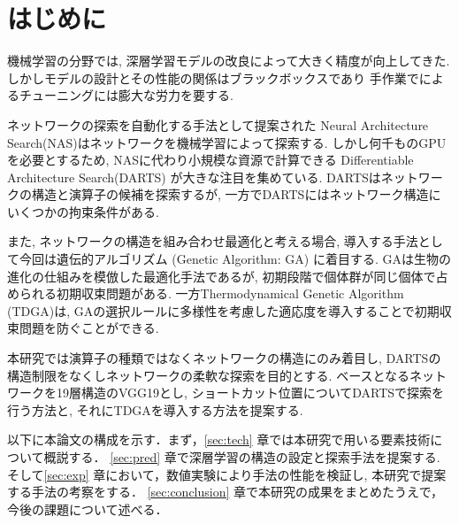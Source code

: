 \newpage
\changeindent{0cm}
\section{はじめに}
\label{sec:intro}
\changeindent{2cm}

機械学習の分野では, 深層学習モデルの改良によって大きく精度が向上してきた.
しかしモデルの設計とその性能の関係はブラックボックスであり
手作業でによるチューニングには膨大な労力を要する.

ネットワークの探索を自動化する手法として提案された
Neural Architecture Search(NAS)はネットワークを機械学習によって探索する.
しかし何千ものGPUを必要とするため, NASに代わり小規模な資源で計算できる
Differentiable Architecture Search(DARTS) が大きな注目を集めている.
DARTSはネットワークの構造と演算子の候補を探索するが,
一方でDARTSにはネットワーク構造にいくつかの拘束条件がある.

また, ネットワークの構造を組み合わせ最適化と考える場合,
導入する手法として今回は遺伝的アルゴリズム (Genetic Algorithm: GA) に着目する.
GAは生物の進化の仕組みを模倣した最適化手法であるが,
初期段階で個体群が同じ個体で占められる初期収束問題がある.
一方Thermodynamical Genetic Algorithm (TDGA)は,
GAの選択ルールに多様性を考慮した適応度を導入することで初期収束問題を防ぐことができる.


本研究では演算子の種類ではなくネットワークの構造にのみ着目し,
DARTSの構造制限をなくしネットワークの柔軟な探索を目的とする.
ベースとなるネットワークを19層構造のVGG19とし,
ショートカット位置についてDARTSで探索を行う方法と, それにTDGAを導入する方法を提案する.


以下に本論文の構成を示す．まず，\ref{sec:tech} 章では本研究で用いる要素技術について概説する．
\ref{sec:pred} 章で深層学習の構造の設定と探索手法を提案する.
そして\ref{sec:exp} 章において，数値実験により手法の性能を検証し, 本研究で提案する手法の考察をする．
\ref{sec:conclusion} 章で本研究の成果をまとめたうえで，今後の課題について述べる．


\begin{comment}
\end{comment}
